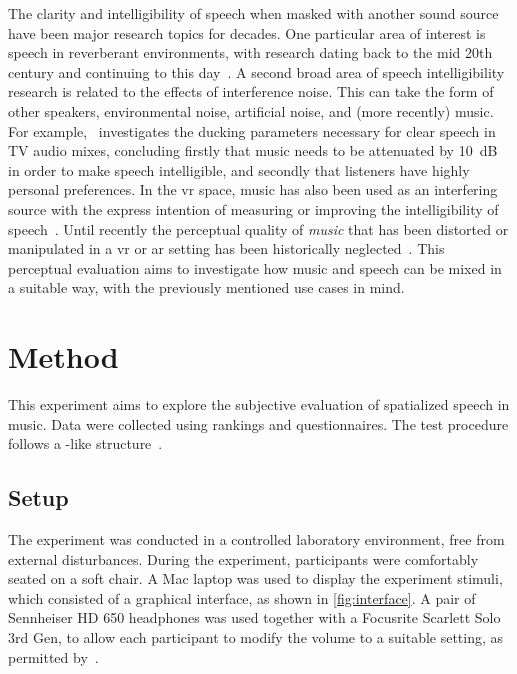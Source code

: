 \documentclass[fleqn]{jaes}
\begin{document}
The clarity and intelligibility of speech when masked with another sound source have been major research topics for decades. One particular area of interest is speech in reverberant environments, with research dating back to the mid 20th century and continuing to this day~\cite{haasInfluenceSingleEcho1972,liDiscussionCorrelationClarity2023}. A second broad area of speech intelligibility research is related to the effects of interference noise. This can take the form of other speakers, environmental noise, artificial noise, and (more recently) music. For example,~\cite{torcoliPreferredLevelsBackground2019} investigates the ducking parameters necessary for clear speech in TV audio mixes, concluding firstly that music needs to be attenuated by 10~dB in order to make speech intelligible, and secondly that listeners have highly personal preferences. In the \gls{vr} space, music has also been used as an interfering source with the express intention of measuring or improving the intelligibility of speech~\cite{akeroyd2ndClarityEnhancement2023,fichnaPerceptualEvaluationSimulated2022}. Until recently the perceptual quality of \textit{music} that has been distorted or manipulated in a \gls{vr} or \gls{ar} setting has been historically neglected~\cite{madsenMusicHearingAids2014,benjaminEvaluatingAudioQuality2024,hakeIndividualDifferencesAuditory2025}. This perceptual evaluation aims to investigate how music and speech can be mixed in a suitable way, with the previously mentioned use cases in mind.

\section{Method}
\label{sec:method}

This experiment aims to explore the subjective evaluation of spatialized speech in music. Data were collected using rankings and questionnaires. The test procedure follows a -like structure~\cite{itu-r-bs.1534-3MethodSubjectiveAssessment2023}.

\subsection{Setup}
The experiment was conducted in a controlled laboratory environment, free from external disturbances. During the experiment, participants were comfortably seated on a soft chair. A Mac laptop was used to display the experiment stimuli, which consisted of a graphical interface, as shown in \cref{fig:interface}. A pair of Sennheiser HD 650 headphones was used together with a Focusrite Scarlett Solo 3rd Gen, to allow each participant to modify the volume to a suitable setting, as permitted by~\cite{itu-r-bs.1534-3MethodSubjectiveAssessment2023}.
\end{document}
